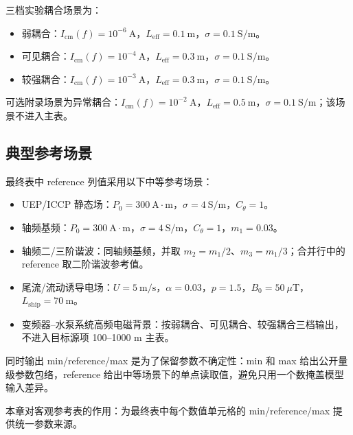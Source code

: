 三档实验耦合场景为：
\begin{itemize}
  \item 弱耦合：$I_{\mathrm{cm}}(f)=10^{-6}\ \mathrm{A}$，$L_{\mathrm{eff}}=0.1\ \mathrm{m}$，$\sigma=0.1\ \mathrm{S/m}$。
  \item 可见耦合：$I_{\mathrm{cm}}(f)=10^{-4}\ \mathrm{A}$，$L_{\mathrm{eff}}=0.3\ \mathrm{m}$，$\sigma=0.1\ \mathrm{S/m}$。
  \item 较强耦合：$I_{\mathrm{cm}}(f)=10^{-3}\ \mathrm{A}$，$L_{\mathrm{eff}}=0.3\ \mathrm{m}$，$\sigma=0.1\ \mathrm{S/m}$。
\end{itemize}

可选附录场景为异常耦合：$I_{\mathrm{cm}}(f)=10^{-2}\ \mathrm{A}$，$L_{\mathrm{eff}}=0.5\ \mathrm{m}$，$\sigma=0.1\ \mathrm{S/m}$；该场景不进入主表。

\subsection{典型参考场景}

最终表中 reference 列值采用以下中等参考场景：

\begin{itemize}
  \item UEP/ICCP 静态场：$P_0=300\ \mathrm{A\cdot m}$，$\sigma=4\ \mathrm{S/m}$，$C_\theta=1$。
  \item 轴频基频：$P_0=300\ \mathrm{A\cdot m}$，$\sigma=4\ \mathrm{S/m}$，$C_\theta=1$，$m_1=0.03$。
  \item 轴频二/三阶谐波：同轴频基频，并取 $m_2=m_1/2$、$m_3=m_1/3$；合并行中的 reference 取二阶谐波参考值。
  \item 尾流/流动诱导电场：$U=5\ \mathrm{m/s}$，$\alpha=0.03$，$p=1.5$，$B_0=50\ \mu\mathrm{T}$，$L_{\mathrm{ship}}=70\ \mathrm{m}$。
  \item 变频器--水泵系统高频电磁背景：按弱耦合、可见耦合、较强耦合三档输出，不进入目标源项 100--1000 m 主表。
\end{itemize}

同时输出 min/reference/max 是为了保留参数不确定性：min 和 max 给出公开量级参数包络，reference 给出中等场景下的单点读取值，避免只用一个数掩盖模型输入差异。

本章对客观参考表的作用：为最终表中每个数值单元格的 min/reference/max 提供统一参数来源。
